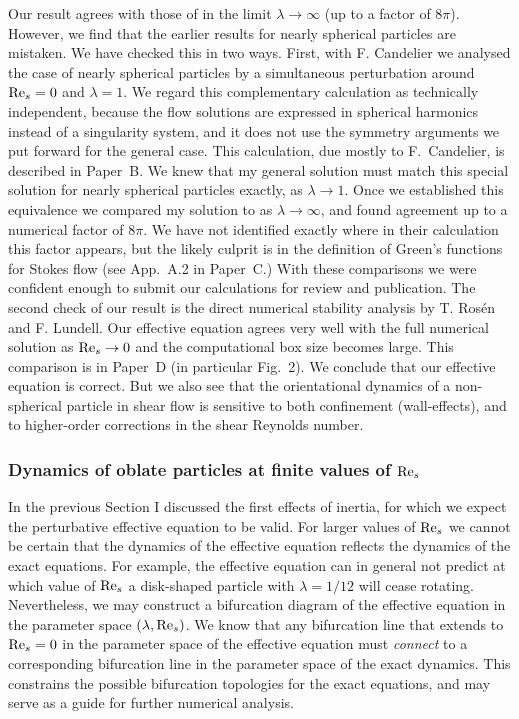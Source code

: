 \documentclass[thesis.tex]{subfiles}
\begin{document}
Our result  agrees with those of \citet{subramanian2005} in the limit $\lambda\to\infty$ (up to a factor of $8\pi$). However, we find that the earlier results for nearly spherical particles \cite{saffman1956,subramanian2006} are mistaken. We have checked this in two ways. First, with F. Candelier we analysed the case of nearly spherical particles by a simultaneous perturbation around $\textrm{Re}_s=0$ and $\lambda=1$. We regard this complementary calculation as technically independent, because the flow solutions are expressed in spherical harmonics instead of a singularity system, and it does not use the symmetry arguments we put forward for the general case. This calculation, due mostly to F.~Candelier, is described in Paper~B. We knew that my general solution must match this special solution for nearly spherical particles exactly, as $\lambda\to1$. Once we established this equivalence we compared my solution to \citet{subramanian2005} as $\lambda\to\infty$, and found agreement up to a numerical factor of $8\pi$. We have not identified exactly where in their calculation this factor appears, but the likely culprit is in the definition of Green's functions for Stokes flow (see App.~A.2 in Paper~C.) With these comparisons we were confident enough to submit our calculations for review and publication. The second check of our result is the direct numerical stability analysis by T. Ros\'en and F. Lundell. Our effective equation  agrees very well with the full numerical solution as $\textrm{Re}_s\to0$ and the computational box size becomes large. This comparison is in Paper~D (in particular Fig.~2). We conclude that our effective equation is correct. But we also see that the orientational dynamics of a non-spherical particle in shear flow is sensitive to both confinement (wall-effects), and to higher-order corrections in the shear Reynolds number.

\subsubsection*{Dynamics of oblate particles at finite values of $\textrm{Re}_s$}
In the previous Section I discussed the first effects of inertia, for which we expect the perturbative effective equation  to be valid. For larger values of $\textrm{Re}_s$ we cannot be certain that the dynamics of the effective equation reflects the dynamics of the exact equations. For example, the effective equation can in general not predict at which value of $\textrm{Re}_s$ a disk-shaped particle with $\lambda=1/12$ will cease rotating. Nevertheless, we may construct a bifurcation diagram of the effective equation in the parameter space $(\lambda, \textrm{Re}_s)$. We know that any bifurcation line that extends to $\textrm{Re}_s=0$ in the parameter space of the effective equation must \emph{connect} to a corresponding bifurcation line in the parameter space of the exact dynamics. This constrains the possible bifurcation topologies for the exact equations, and may serve as a guide for further numerical analysis.
\end{document}
